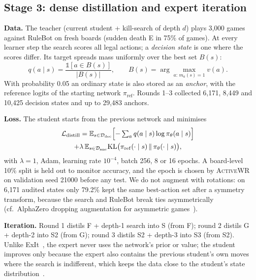 \documentclass[conference]{IEEEtran}
\newcommand{\awr}{\textsc{ActiveWR}}
\begin{document}
\subsection{Stage 3: dense distillation and expert iteration}
\textbf{Data.} The teacher (current student + kill-search of depth $d$) plays 3{,}000 games against RuleBot on fresh boards (sudden death E in 75\% of games). At every learner step the search scores all legal actions; a \emph{decision state} is one where the scores differ. Its target spreads mass uniformly over the best set $B(s)$:
\begin{equation}
q(a\mid s)=\frac{\mathbb{1}[a\in B(s)]}{|B(s)|},\qquad B(s)=\arg\max_{a:\,m_a(s)=1} v(a).
\end{equation}
With probability 0.05 an ordinary state is also stored as an \emph{anchor}, with the reference logits of the starting network $\pi_{\mathrm{ref}}$. Rounds 1--3 collected 6{,}171, 8{,}449 and 10{,}425 decision states and up to 29{,}483 anchors.

\textbf{Loss.} The student starts from the previous network and minimises
\begin{multline}
\mathcal{L}_{\mathrm{distill}}=\mathbb{E}_{s\in\mathcal{D}_{\mathrm{dec}}}\Bigl[-\textstyle\sum_a q(a\mid s)\log\pi_\theta(a\mid s)\Bigr]\\
+\lambda\,\mathbb{E}_{s\in\mathcal{D}_{\mathrm{anc}}}\mathrm{KL}\bigl(\pi_{\mathrm{ref}}(\cdot\mid s)\,\Vert\,\pi_\theta(\cdot\mid s)\bigr),
\end{multline}
with $\lambda=1$, Adam, learning rate $10^{-4}$, batch 256, 8 or 16 epochs. A board-level 10\% split is held out to monitor accuracy, and the epoch is chosen by \awr{} on validation seed 21000 before any test. We do not augment with rotations: on 6{,}171 audited states only 79.2\% kept the same best-action set after a symmetry transform, because the search and RuleBot break ties asymmetrically (cf.\ AlphaZero dropping augmentation for asymmetric games~\cite{silver2017alphazero}).

\textbf{Iteration.} Round 1 distils F + depth-1 search into S (from F); round 2 distils G + depth-2 into S2 (from G); round 3 distils S2 + depth-3 into S3 (from S2). Unlike ExIt~\cite{anthony2017exit}, the expert never uses the network's prior or value; the student improves only because the expert also contains the previous student's own moves where the search is indifferent, which keeps the data close to the student's state distribution~\cite{ross2011dagger}.
\end{document}
